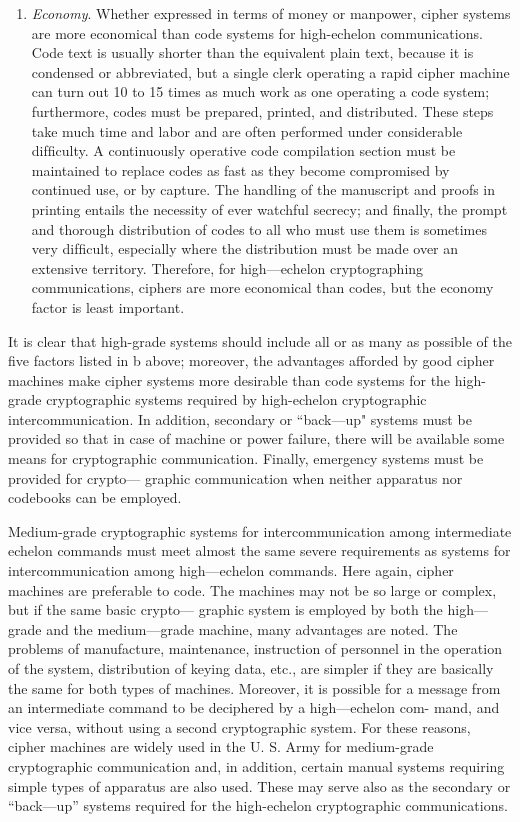\begin{enumerate}
\item \textit{Economy}. Whether expressed in terms of money or manpower, cipher systems are more economical than code systems
for high-echelon communications. Code text is usually shorter
than the equivalent plain text, because it is condensed or
abbreviated, but a single clerk operating a rapid cipher machine
can turn out 10 to 15 times as much work as one operating a
code system; furthermore, codes must be prepared, printed,
and distributed. These steps take much time and labor and are
often performed under considerable difﬁculty. A continuously
operative code compilation section must be maintained to replace
codes as fast as they become compromised by continued use, or
by capture. The handling of the manuscript and proofs in printing entails the necessity of ever watchful secrecy; and ﬁnally,
the prompt and thorough distribution of codes to all who must
use them is sometimes very difﬁcult, especially where the distribution must be made over an extensive territory. Therefore,
for high—echelon cryptographing communications, ciphers are
more economical than codes, but the economy factor is least
important.
\end{enumerate}

\mypara It is clear that high-grade systems should include all or as many as
possible of the ﬁve factors listed in b above; moreover, the advantages
afforded by good cipher machines make cipher systems more desirable
than code systems for the high-grade cryptographic systems required by
high-echelon cryptographic intercommunication. In addition, secondary
or “back—up" systems must be provided so that in case of machine or
power failure, there will be available some means for cryptographic communication. Finally, emergency systems must be provided for crypto—
graphic communication when neither apparatus nor codebooks can be
employed.

\mypara Medium-grade cryptographic systems for intercommunication
among intermediate echelon commands must meet almost the same severe
requirements as systems for intercommunication among high—echelon
commands. Here again, cipher machines are preferable to code. The
machines may not be so large or complex, but if the same basic crypto—
graphic system is employed by both the high—grade and the medium—grade
machine, many advantages are noted. The problems of manufacture,
maintenance, instruction of personnel in the operation of the system,
distribution of keying data, etc., are simpler if they are basically the
same for both types of machines. Moreover, it is possible for a message
from an intermediate command to be deciphered by a high—echelon com-
mand, and vice versa, without using a second cryptographic system. For
these reasons, cipher machines are widely used in the U. S. Army for
medium-grade cryptographic communication and, in addition, certain
manual systems requiring simple types of apparatus are also used. These
may serve also as the secondary or “back—up” systems required for the
high-echelon cryptographic communications.

